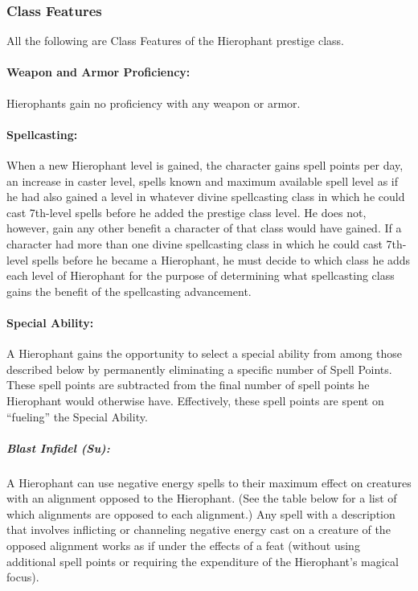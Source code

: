 \subsubsection{Class Features}
All the following are Class Features of the Hierophant prestige class.

\paragraph{Weapon and Armor Proficiency:} Hierophants gain no proficiency with any weapon or armor.

\paragraph{Spellcasting:} When a new Hierophant level is gained, the character gains spell points per day, an increase in caster level, spells known and maximum available spell level as if he had also gained a level in whatever divine spellcasting class in which he could cast 7th-level spells before he added the prestige class level. 
He does not, however, gain any other benefit a character of that class would have gained. 
If a character had more than one divine spellcasting class in which he could cast 7th-level spells before he became a Hierophant, he must decide to which class he adds each level of Hierophant for the purpose of determining what spellcasting class gains the benefit of the spellcasting advancement.

\paragraph{Special Ability:}
A Hierophant gains the opportunity to select a special ability from among those described below by permanently eliminating a specific number of Spell Points.
These spell points are subtracted from the final number of spell points he Hierophant would otherwise have.
Effectively, these spell points are spent on ``fueling'' the Special Ability.

\subparagraph{Blast Infidel (Su):}
A Hierophant can use negative energy spells to their maximum effect on creatures with an alignment opposed to the Hierophant. (See the table below for a list of which alignments are opposed to each alignment.) 
Any spell with a description that involves inflicting or channeling negative energy cast on a creature of the opposed alignment works as if under the effects of a  feat (without using additional spell points or requiring the expenditure of the Hierophant's magical focus).

